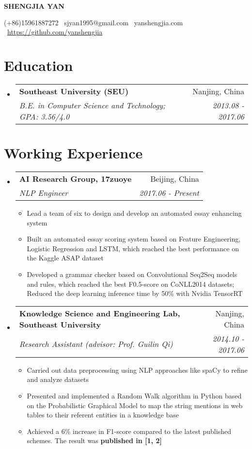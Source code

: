 \documentclass[letterpaper, 11pt]{article}
\makeatletter
\newcommand{\resumeSingleSubItem}[1]{
   \item\small{#1} \vspace{-3pt}
}
\newcommand{\resumeSubheading}[4]{
  \vspace{-2pt}\item
    \begin{tabular*}{0.97\textwidth}[t]{l@{\extracolsep{\fill}}r}
      \textbf{#1} & #2 \\
      \textit{\small#3} & \textit{\small #4} \\
    \end{tabular*}\vspace{-7pt}
}
\newcommand{\resumeSubHeadingListStart}{\begin{itemize}[leftmargin=*]}
\newcommand{\resumeSubHeadingListEnd}{\end{itemize}\vspace{-9.6pt}}
\newcommand{\resumeItemListStart}{\begin{itemize}[leftmargin=*]}
\newcommand{\resumeItemListEnd}{\end{itemize}\vspace{-5pt}}
\newcommand{\name}[1]{
  \centerline{\huge \textbf{#1}}
  \vspace{1.25ex}
}
\makeatother
\begin{document}
\name{SHENGJIA YAN}
\centerline{(+86)15961887272 \textperiodcentered\ sjyan1995@gmail.com \textperiodcentered\ yanshengjia.com \textperiodcentered\ \href{https://github.com/yanshengjia}{https://github.com/yanshengjia}}


\section{Education}
    \resumeSubHeadingListStart
        \resumeSubheading
        {Southeast University (SEU)}{Nanjing, China}
        {B.E. in Computer Science and Technology;  GPA: 3.56/4.0}{2013.08 - 2017.06}
    \resumeSubHeadingListEnd

\section{Working Experience}
    \resumeSubHeadingListStart

    \resumeSubheading
        {AI Research Group, 17zuoye}{Beijing, China}
        {NLP Engineer}{2017.06 - Present}
        \resumeItemListStart
            \resumeSingleSubItem{Lead a team of six to design and develop an automated essay enhancing system}
            \resumeSingleSubItem{Built an automated essay scoring system based on Feature Engineering, Logistic Regression and LSTM, which reached the best performance on the Kaggle ASAP dataset}
            \resumeSingleSubItem{Developed a grammar checker based on Convolutional Seq2Seq models and rules, which reached the best F0.5-score on CoNLL2014 datasets; Reduced the deep learning inference time by 50\% with Nvidia TensorRT}
        \resumeItemListEnd

    \resumeSubheading
        {Knowledge Science and Engineering Lab, Southeast University}{Nanjing, China}
        {Research Assistant (advisor: Prof. Guilin Qi)}{2014.10 - 2017.06}
        \resumeItemListStart
            \resumeSingleSubItem
                {Carried out data preprocessing using NLP approaches like spaCy to refine and analyze datasets}
            \resumeSingleSubItem
                {Presented and implemented a Random Walk algorithm in Python based on the Probabilistic Graphical Model to map the string mentions in web tables to their referent entities in a knowledge base}
            \resumeSingleSubItem
                {Achieved a 6\% increase in F1-score compared to the latest published schemes. The result was \textbf{published in [1, 2]}}
        \resumeItemListEnd
    \resumeSubHeadingListEnd
\end{document}
